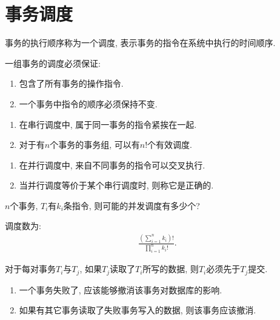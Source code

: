 \section{事务调度}

\begin{definition}[调度]
  事务的执行顺序称为一个调度, 表示事务的指令在系统中执行的时间顺序.

  一组事务的调度必须保证:
  \begin{enumerate}
      \item 包含了所有事务的操作指令.
      \item 一个事务中指令的顺序必须保持不变.
  \end{enumerate}
\end{definition}

\begin{definition}[串行调度]
  \begin{enumerate}
      \item 在串行调度中, 属于同一事务的指令紧挨在一起.
      \item 对于有$n$个事务的事务组, 可以有$n!$个有效调度.
  \end{enumerate}
\end{definition}

\begin{definition}[并行调度]
  \begin{enumerate}
      \item 在并行调度中, 来自不同事务的指令可以交叉执行.
      \item 当并行调度等价于某个串行调度时, 则称它是正确的.
  \end{enumerate}
\end{definition}

\begin{example}
  $n$个事务, $T_i$有$k_i$条指令, 则可能的并发调度有多少个?

  调度数为:
  \begin{align*}
      \frac{\left(\sum_{i=1}^{n}k_i\right)!}{\prod_{i=1}^n k_i!}.
  \end{align*}
\end{example}

\begin{definition}[可恢复调度]
  对于每对事务$T_i$与$T_j$, 如果$T_j$读取了$T_i$所写的数据, 则$T_i$必须先于$T_j$提交.
  \begin{enumerate}
      \item 一个事务失败了, 应该能够撤消该事务对数据库的影响.
      \item 如果有其它事务读取了失败事务写入的数据, 则该事务应该撤消.
  \end{enumerate}
\end{definition}

